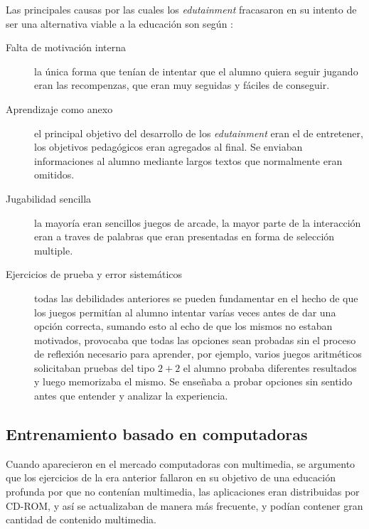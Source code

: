 Las principales causas por las cuales los \emph{edutainment} fracasaron en su
intento de ser una alternativa viable a la educación son según
\cite{egenfeldt2007third}: \begin{description}

    \item[Falta de motivación interna] la única forma que tenían de intentar que
	    el alumno quiera seguir jugando eran las recompenzas, que eran muy
	    seguidas y fáciles de conseguir.

    \item[Aprendizaje como anexo] el principal objetivo del desarrollo de los
	    \emph{edutainment} eran el de entretener, los objetivos pedagógicos
	    eran agregados al final. Se enviaban informaciones al alumno
	    mediante largos textos que normalmente eran omitidos.
    
    \item[Jugabilidad sencilla] la mayoría eran sencillos juegos de arcade, la
	    mayor parte de la interacción eran a traves de palabras que eran
	    presentadas en forma de selección multiple. 

    \item[Ejercicios de prueba y error sistemáticos] todas las debilidades
	    anteriores se pueden fundamentar en el hecho de que los juegos
	    permitían al alumno intentar varías veces antes de dar una opción
	    correcta, sumando esto al echo de que los mismos no estaban
	    motivados, provocaba que todas las opciones sean probadas sin el
	    proceso de reflexión necesario para aprender, por ejemplo, varios
	    juegos aritméticos solicitaban pruebas del tipo
	    \begin{math}{2+2}\end{math} el alumno probaba diferentes resultados
	    y luego memorizaba el mismo. Se enseñaba a probar opciones sin
	    sentido antes que entender y analizar la experiencia.

\end{description}

\subsection{Entrenamiento basado en computadoras}

Cuando aparecieron en el mercado computadoras con multimedia, se argumento que
los ejercicios de la era anterior fallaron en su objetivo de una educación
profunda por que no contenían multimedia\cite{leinonen:ict}, las aplicaciones
eran distribuidas por CD-ROM, y así se actualizaban de manera más frecuente, y
podían contener gran cantidad de contenido multimedia.

